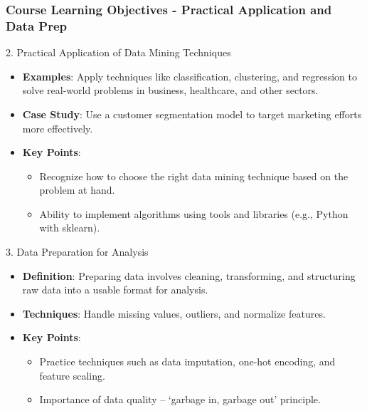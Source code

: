 \documentclass{beamer}
\begin{document}
\begin{frame}[fragile]
    \frametitle{Course Learning Objectives - Practical Application and Data Prep}
    \begin{block}{2. Practical Application of Data Mining Techniques}
        \begin{itemize}
            \item \textbf{Examples}: Apply techniques like classification, clustering, and regression to solve real-world problems in business, healthcare, and other sectors.
            \item \textbf{Case Study}: Use a customer segmentation model to target marketing efforts more effectively.
            \item \textbf{Key Points}:
            \begin{itemize}
                \item Recognize how to choose the right data mining technique based on the problem at hand.
                \item Ability to implement algorithms using tools and libraries (e.g., Python with sklearn).
            \end{itemize}
        \end{itemize}
    \end{block}

    \begin{block}{3. Data Preparation for Analysis}
        \begin{itemize}
            \item \textbf{Definition}: Preparing data involves cleaning, transforming, and structuring raw data into a usable format for analysis.
            \item \textbf{Techniques}: Handle missing values, outliers, and normalize features.
            \item \textbf{Key Points}:
            \begin{itemize}
                \item Practice techniques such as data imputation, one-hot encoding, and feature scaling.
                \item Importance of data quality – ‘garbage in, garbage out’ principle.
            \end{itemize}
        \end{itemize}
    \end{block}
\end{frame}
\end{document}
